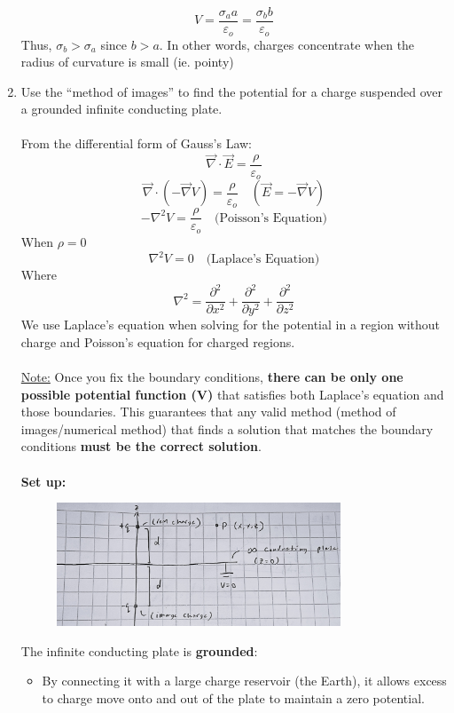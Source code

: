 \documentclass[12pt]{article}
\begin{document}
\begin{enumerate}
    \[V=\frac{\sigma_a a}{\varepsilon_o}=\frac{\sigma_b b}{\varepsilon_o}\]
    Thus, $\sigma_b > \sigma_a$ since $b>a$. In other words, charges concentrate when the radius of curvature is small (ie. pointy)
\newpage
    \item Use the ``method of images'' to find the potential for a charge suspended over a grounded infinite conducting plate.\\\\
    From the differential form of Gauss's Law:
    \[\vec{\nabla} \cdot \vec{E} = \frac{\rho}{\varepsilon_o}\]
    \[\vec{\nabla} \cdot (-\vec{\nabla}V) = \frac{\rho}{\varepsilon_o} \quad (\vec{E}=-\vec{\nabla}V)\]
    \[\boxed{-\nabla^2 V = \frac{\rho}{\varepsilon_o} \quad \text{(Poisson's Equation)}}\]
    When $\rho=0$
    \[\boxed{\nabla^2 V = 0 \quad \text{(Laplace's Equation)}}\]
Where 
\[\nabla^2 = 
\frac{\partial^2}{\partial x^2} +
\frac{\partial^2}{\partial y^2} +
\frac{\partial^2}{\partial z^2}\]
We use Laplace's equation when solving for the potential in a region without charge and Poisson's equation for charged regions.\\\\
\underline{Note:} Once you fix the boundary conditions, \textbf{there can be only one possible potential function (V)} that satisfies both Laplace’s equation and those boundaries. This guarantees that any valid method (method of images/numerical method) that finds a solution that matches the boundary conditions \textbf{must be the correct solution}.\\\\
\textbf{Set up:}
    \begin{figure}[H]
            \centering
            \includegraphics[width=0.8\textwidth]{method of images.JPG}
    \end{figure}
The infinite conducting plate is \textbf{grounded}:
\begin{itemize}
    \item By connecting it with a large charge reservoir (the Earth), it allows excess to charge move onto and out of the plate to maintain a zero potential.

\end{itemize}
\end{enumerate}
\end{document}
